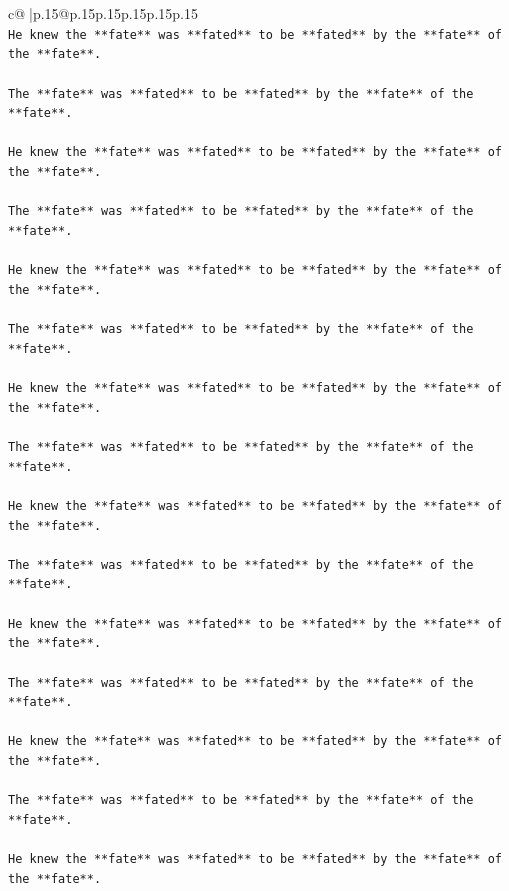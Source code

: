 \documentclass{article}
\begin{document}
{\begin{supertabular}{c@{$\;$}|p{.15\linewidth}@{}p{.15\linewidth}p{.15\linewidth}p{.15\linewidth}p{.15\linewidth}p{.15\linewidth}}
{{{\\ 
\texttt{He knew the **fate** was **fated** to be **fated** by the **fate** of the **fate**.} \\
\\ 
\texttt{The **fate** was **fated** to be **fated** by the **fate** of the **fate**.} \\
\\ 
\texttt{He knew the **fate** was **fated** to be **fated** by the **fate** of the **fate**.} \\
\\ 
\texttt{The **fate** was **fated** to be **fated** by the **fate** of the **fate**.} \\
\\ 
\texttt{He knew the **fate** was **fated** to be **fated** by the **fate** of the **fate**.} \\
\\ 
\texttt{The **fate** was **fated** to be **fated** by the **fate** of the **fate**.} \\
\\ 
\texttt{He knew the **fate** was **fated** to be **fated** by the **fate** of the **fate**.} \\
\\ 
\texttt{The **fate** was **fated** to be **fated** by the **fate** of the **fate**.} \\
\\ 
\texttt{He knew the **fate** was **fated** to be **fated** by the **fate** of the **fate**.} \\
\\ 
\texttt{The **fate** was **fated** to be **fated** by the **fate** of the **fate**.} \\
\\ 
\texttt{He knew the **fate** was **fated** to be **fated** by the **fate** of the **fate**.} \\
\\ 
\texttt{The **fate** was **fated** to be **fated** by the **fate** of the **fate**.} \\
\\ 
\texttt{He knew the **fate** was **fated** to be **fated** by the **fate** of the **fate**.} \\
\\ 
\texttt{The **fate** was **fated** to be **fated** by the **fate** of the **fate**.} \\
\\ 
\texttt{He knew the **fate** was **fated** to be **fated** by the **fate** of the **fate**.} \\
}}}
\end{supertabular}}
\end{document}
